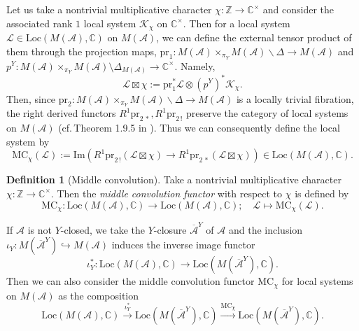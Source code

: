 \documentclass[a4paper,12pt]{article}
\theoremstyle{definition}
\newtheorem{df}[thm]{Definition}
\theoremstyle{remark}
\begin{document}
Let us take a nontrivial multiplicative character $\chi\colon \mathbb{Z}\rightarrow \mathbb{C}^{\times}$ and 
consider the associated rank $1$ local system $\mathcal{K}_{\chi}$
on $\mathbb{C}^{\times}$.
Then for a local system $\mathcal{L}\in \mathrm{Loc}(M(\mathcal{A}),\mathbb{C})$ on $M(\mathcal{A})$,
we can define the external tensor product of them through the projection maps,
$\mathrm{pr}_{1}\colon M(\mathcal{A})\times_{\pi_{Y}}M(\mathcal{A})\backslash 
\Delta\rightarrow M(\mathcal{A})$ and $p^{Y}\colon M(\mathcal{A})\times_{\pi_{Y}}M(\mathcal{A})\setminus \Delta_{M(\mathcal{A})}\longrightarrow \mathbb{C}^{\times}$.
Namely,
\[
	\mathcal{L}\boxtimes \chi:=
	\mathrm{pr}_{1}^{*}\mathcal{L}\otimes (p^{Y})^{*}\mathcal{K}_{\chi}.
\]
Then, since $\mathrm{pr}_{2}\colon M(\mathcal{A})\times_{\pi_{Y}}M(\mathcal{A})\backslash 
\Delta\rightarrow M(\mathcal{A})$
is a locally trivial fibration, 
the right derived functors 
$R^{1}\mathrm{pr}_{2\,*}, R^{1}\mathrm{pr}_{2\,!}$
preserve the category of local systems on $M(\mathcal{A})$
(cf.\,Theorem 1.9.5 in \cite{Ach}).
Thus we can consequently define the local system by
\[
	\mathrm{MC}_{\chi}(\mathcal{L}):=\mathrm{Im}(R^{1}\mathrm{pr}_{2\,!}(\mathcal{L}\boxtimes \chi)
	\rightarrow R^{1}\mathrm{pr}_{2\,*}(\mathcal{L}\boxtimes \chi))
	\in \mathrm{Loc}(M(\mathcal{A}),\mathbb{C}).
\] 
\begin{df}[Middle convolution]\label{df:MC}
	Take a nontrivial multiplicative character $\chi\colon \mathbb{Z}\rightarrow \mathbb{C}^{\times}$.
	Then the {\em middle convolution functor} with respect to $\chi$ is defined by
	\[
		\mathrm{MC}_{\chi}\colon \mathrm{Loc}(M(\mathcal{A}),\mathbb{C})
		\rightarrow \mathrm{Loc}(M(\mathcal{A}),\mathbb{C});\quad
		\mathcal{L}\mapsto \mathrm{MC}_{\chi}(\mathcal{L}).			
	\]
\end{df}

If $\mathcal{A}$ is not $Y$-closed, 
we take the $Y$-closure $\overline{\mathcal{A}}^{Y}$ of $\mathcal{A}$ and 
the inclusion $\iota_{Y}\colon M(\overline{\mathcal{A}}^{Y})\hookrightarrow M(\mathcal{A})$
induces the inverse image functor
\[
	\iota_{Y}^{*}\colon \mathrm{Loc}(M(\mathcal{A}),\mathbb{C})\longrightarrow \mathrm{Loc}(M(\overline{\mathcal{A}}^{Y}),\mathbb{C}).
\]
Then we can also consider 
the middle convolution functor $\mathrm{MC}_{\chi}$ for local systems on $M(\mathcal{A})$ as the composition
\[
\mathrm{Loc}(M(\mathcal{A}),\mathbb{C})\xrightarrow{\iota_{Y}^*}\mathrm{Loc}(M(\overline{\mathcal{A}}^{Y}),\mathbb{C})\xrightarrow{\mathrm{MC}_{\chi}}\mathrm{Loc}(M(\overline{\mathcal{A}}^{Y}),\mathbb{C}).
\]
\end{document}
